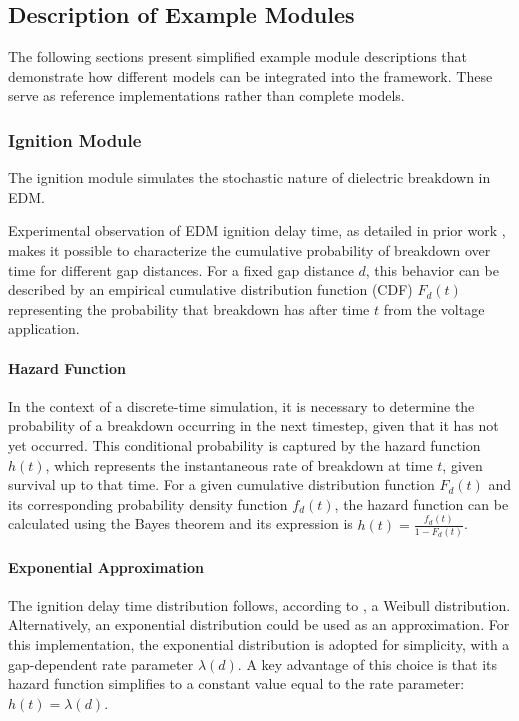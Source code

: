 \documentclass[5p,times,procedia]{elsarticle}
\begin{document}
\subsection{Description of Example Modules}

The following sections present simplified example module descriptions that demonstrate how different models can be integrated into the framework. These serve as reference implementations rather than complete models.

\subsubsection{Ignition Module}
\label{sec:ignition_module}

The ignition module simulates the stochastic nature of dielectric breakdown in EDM. 


Experimental observation of EDM ignition delay time, as detailed in prior work \cite{jmmp7050177}, makes it possible to characterize the cumulative probability of breakdown over time for different gap distances. For a fixed gap distance $d$, this behavior can be described by an empirical cumulative distribution function (CDF) $F_d(t)$ representing the probability that breakdown has after time $t$ from the voltage application.


\paragraph{Hazard Function}
In the context of a discrete-time simulation, it is necessary to determine the probability of a breakdown occurring in the next timestep, given that it has not yet occurred. This conditional probability is captured by the hazard function $h(t)$, which represents the instantaneous rate of breakdown at time $t$, given survival up to that time. For a given cumulative distribution function $F_d(t)$ and its corresponding probability density function $f_d(t)$, the hazard function can be calculated using the Bayes theorem and its expression is $h(t) = \frac{f_d(t)}{1-F_d(t)}$.


\paragraph{Exponential Approximation}
The ignition delay time distribution follows, according to \cite{jmmp7050177}, a Weibull distribution. Alternatively, an exponential distribution could be used as an approximation. For this implementation, the exponential distribution is adopted for simplicity, with a gap-dependent rate parameter $\lambda(d)$. A key advantage of this choice is that its hazard function simplifies to a constant value equal to the rate parameter: $h(t) = \lambda(d)$.
\end{document}
